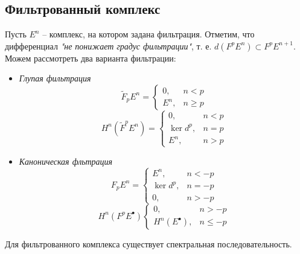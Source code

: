 \documentclass[../main.tex]{subfiles}
\begin{document}
\subsection{Фильтрованный комплекс}
Пусть $E^n$  -- комплекс, на котором задана фильтрация. Отметим, что дифференциал \textit{"не понижает градус фильтрации"}, т. е.  $d(F^pE^n)\subset F^p E^{n+1}$. Можем рассмотреть два варианта фильтрации:
\begin{itemize}
\item \textit{Глупая фильтрация}
\[
\widetilde{F}_p E^n = \begin{cases} 0, &n < p \\ E^n, & n \ge p \end{cases}
\]
\[
H^n(\widetilde{F}^p E^n) = \begin{cases} 0, &n < p\\ \ker d^p, & n=p \\ E^n, & n > p \end{cases}
\]
\bee
{}
\eee
\item \textit{Каноническая фльтрация}
\[
F_p E^n = \begin{cases} E^n, &n < -p \\ \ker d^p, & n = -p \\ 0, & n>-p \end{cases}
\]
\[
H^n (F^p E^\bullet) \begin{cases} 0, &n > -p \\ H^n(E^\bullet), & n\le-p \end{cases}
\]
\bee
{}
\eee
\end{itemize}
\begin{to_ex}
Для фильтрованного комплекса существует спектральная последовательность. 
\end{to_ex}
\end{document}

